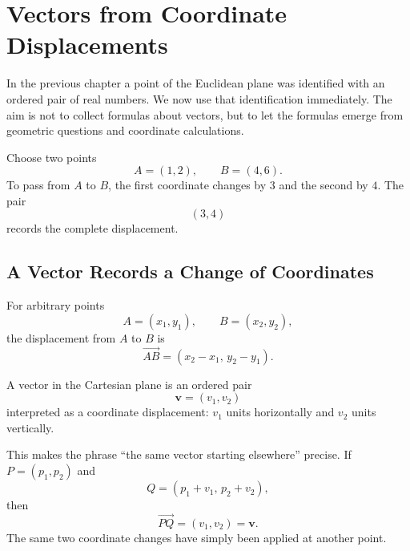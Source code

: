 \section{Vectors from Coordinate Displacements}

In the previous chapter a point of the Euclidean plane was identified with an
ordered pair of real numbers. We now use that identification immediately. The
aim is not to collect formulas about vectors, but to let the formulas emerge
from geometric questions and coordinate calculations.

Choose two points
\[
A=(1,2),
\qquad
B=(4,6).
\]
To pass from $A$ to $B$, the first coordinate changes by $3$ and the second by
$4$. The pair
\[
(3,4)
\]
records the complete displacement.

\subsection{A Vector Records a Change of Coordinates}

For arbitrary points
\[
A=(x_1,y_1),
\qquad
B=(x_2,y_2),
\]
the displacement from $A$ to $B$ is
\[
\overrightarrow{AB}
=
(x_2-x_1,\,y_2-y_1).
\]

\begin{definitionbox}
A vector in the Cartesian plane is an ordered pair
\[
\mathbf v=(v_1,v_2)
\]
interpreted as a coordinate displacement: $v_1$ units horizontally and $v_2$
units vertically.
\end{definitionbox}

This makes the phrase ``the same vector starting elsewhere'' precise. If
$P=(p_1,p_2)$ and
\[
Q=(p_1+v_1,\,p_2+v_2),
\]
then
\[
\overrightarrow{PQ}=(v_1,v_2)=\mathbf v.
\]
The same two coordinate changes have simply been applied at another point.

\begin{center}
\end{center}

